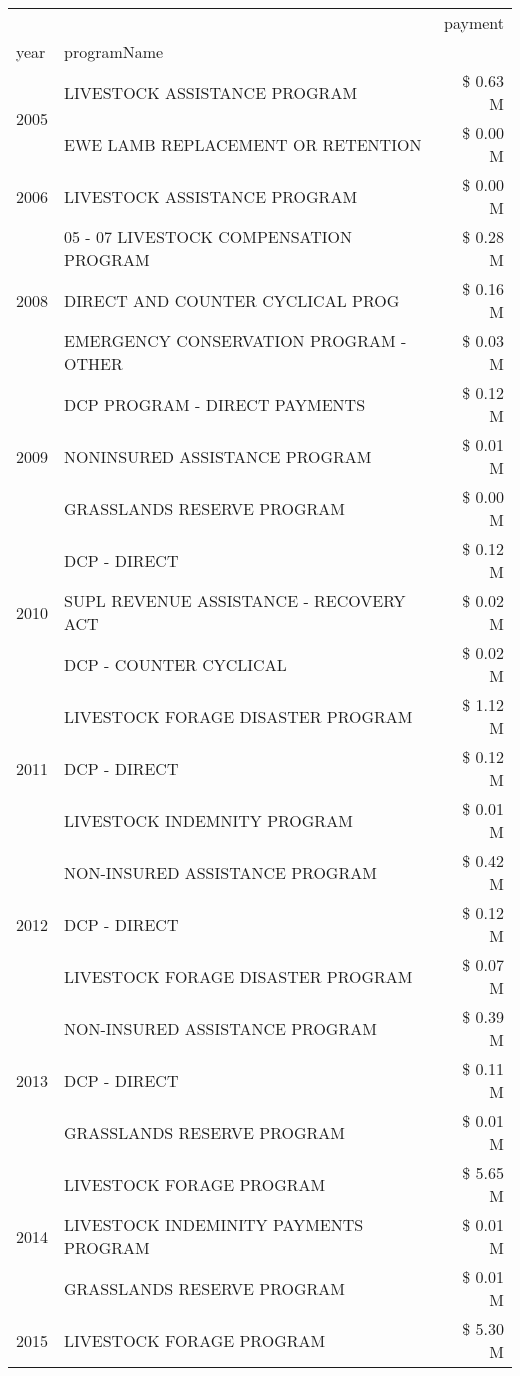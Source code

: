 \begin{tabular}{llr}
\toprule
 &  & payment \\
year & programName &  \\
\midrule
\multirow[t]{2}{*}{2005} & LIVESTOCK ASSISTANCE PROGRAM & \$ 0.63 M \\
 & EWE LAMB REPLACEMENT OR RETENTION & \$ 0.00 M \\
\cline{1-3}
2006 & LIVESTOCK ASSISTANCE PROGRAM & \$ 0.00 M \\
\cline{1-3}
\multirow[t]{3}{*}{2008} & 05 - 07 LIVESTOCK COMPENSATION PROGRAM & \$ 0.28 M \\
 & DIRECT AND COUNTER CYCLICAL PROG & \$ 0.16 M \\
 & EMERGENCY CONSERVATION PROGRAM - OTHER & \$ 0.03 M \\
\cline{1-3}
\multirow[t]{3}{*}{2009} & DCP PROGRAM - DIRECT PAYMENTS & \$ 0.12 M \\
 & NONINSURED ASSISTANCE PROGRAM & \$ 0.01 M \\
 & GRASSLANDS RESERVE PROGRAM & \$ 0.00 M \\
\cline{1-3}
\multirow[t]{3}{*}{2010} & DCP - DIRECT & \$ 0.12 M \\
 & SUPL REVENUE ASSISTANCE - RECOVERY ACT & \$ 0.02 M \\
 & DCP - COUNTER CYCLICAL & \$ 0.02 M \\
\cline{1-3}
\multirow[t]{3}{*}{2011} & LIVESTOCK FORAGE DISASTER PROGRAM & \$ 1.12 M \\
 & DCP - DIRECT & \$ 0.12 M \\
 & LIVESTOCK INDEMNITY PROGRAM & \$ 0.01 M \\
\cline{1-3}
\multirow[t]{3}{*}{2012} & NON-INSURED ASSISTANCE PROGRAM & \$ 0.42 M \\
 & DCP - DIRECT & \$ 0.12 M \\
 & LIVESTOCK FORAGE DISASTER PROGRAM & \$ 0.07 M \\
\cline{1-3}
\multirow[t]{3}{*}{2013} & NON-INSURED ASSISTANCE PROGRAM & \$ 0.39 M \\
 & DCP - DIRECT & \$ 0.11 M \\
 & GRASSLANDS RESERVE PROGRAM & \$ 0.01 M \\
\cline{1-3}
\multirow[t]{3}{*}{2014} & LIVESTOCK FORAGE PROGRAM & \$ 5.65 M \\
 & LIVESTOCK INDEMINITY PAYMENTS PROGRAM & \$ 0.01 M \\
 & GRASSLANDS RESERVE PROGRAM & \$ 0.01 M \\
\cline{1-3}
\multirow[t]{3}{*}{2015} & LIVESTOCK FORAGE PROGRAM & \$ 5.30 M \\

\end{tabular}

